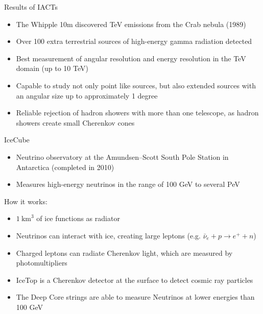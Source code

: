 \documentclass[aspectratio=1610, 10pt]{beamer}
\begin{document}
\begin{frame}{Results of IACTs}
  \begin{itemize}
    \item The Whipple 10m discovered TeV emissions from the Crab nebula (1989) %
    \medskip
    \item Over 100 extra terrestrial sources of high-energy gamma radiation detected \cite{iact_2}
    \medskip
    \item Best measurement of angular resolution and energy resolution in the TeV domain (up to 10 TeV)
    \medskip
    \item Capable to study not only point like sources, but also extended sources with an angular size up
    to approximately 1 degree
    \medskip
    \item  Reliable rejection of hadron showers with more than one telescope, as hadron showers create small Cherenkov cones
  \end{itemize}
\end{frame}

\begin{frame}{IceCube}
  \begin{itemize}
    \item Neutrino observatory at the Amundsen–Scott South Pole Station in Antarctica (completed in 2010)
    \medskip
    \item Measures high-energy neutrinos in the range of 100 GeV to several PeV
  \end{itemize}
\vspace{0.5cm}
  How it works:
  \begin{itemize}
    \item $1 \: \mathrm{km}^3$ of ice functions as radiator
    \medskip
    \item Neutrinos can interact with ice, creating large leptons (e.g. $\bar{\nu}_e + p \rightarrow e^{+} + n$)
    \medskip
    \item Charged leptons can radiate Cherenkov light, which are measured by photomultipliers
    \medskip
    \item IceTop is a Cherenkov detector at the surface to detect cosmic ray particles
    \medskip
    \item The Deep Core strings are able to measure Neutrinos at lower energies than 100 GeV
  \end{itemize}
\end{frame}
\end{document}
